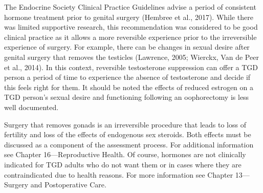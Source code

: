 \documentclass[
]{book}
\begin{document}
The Endocrine Society Clinical Practice
Guidelines advise a period of consistent hormone
treatment prior to genital surgery (Hembree
et al., 2017). While there was limited supportive
research, this recommendation was considered to
be good clinical practice as it allows a more
reversible experience prior to the irreversible
experience of surgery. For example, there can be
changes in sexual desire after genital surgery that
removes the testicles (Lawrence, 2005; Wierckx,
Van de Peer et al., 2014). In this context, reversible testosterone suppression can offer a TGD
person a period of time to experience the absence
of testosterone and decide if this feels right for
them. It should be noted the effects of reduced
estrogen on a TGD person's sexual desire and
functioning following an oophorectomy is less
well documented.

Surgery that removes gonads is an irreversible
procedure that leads to loss of fertility and loss
of the effects of endogenous sex steroids. Both
effects must be discussed as a component of the
assessment process. For additional information
see Chapter 16---Reproductive Health. Of course,
hormones are not clinically indicated for TGD
adults who do not want them or in cases where
they are contraindicated due to health reasons.
For more information see Chapter 13---Surgery
and Postoperative Care.
\end{document}
